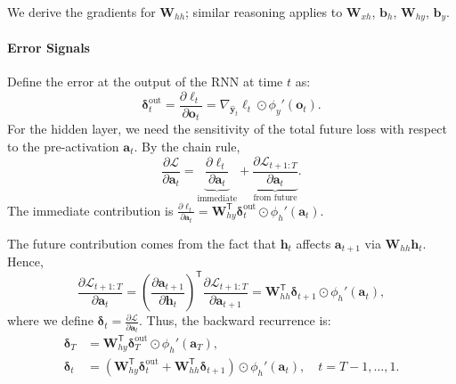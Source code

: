 \documentclass{tufte-handout}
\begin{document}
We derive the gradients for $\mathbf{W}_{hh}$; similar reasoning applies to $\mathbf{W}_{xh}$, $\mathbf{b}_h$, $\mathbf{W}_{hy}$, $\mathbf{b}_y$.

\paragraph{Error Signals}
Define the error at the output of the RNN at time $t$ as:
\[
\boldsymbol{\delta}_t^{\text{out}} = \frac{\partial \ell_t}{\partial \mathbf{o}_t} = \nabla_{\hat{\mathbf{y}}_t} \ell_t \odot \phi_y'(\mathbf{o}_t).
\]
For the hidden layer, we need the sensitivity of the total future loss with respect to the pre-activation $\mathbf{a}_t$. By the chain rule,
\[
\frac{\partial \mathcal{L}}{\partial \mathbf{a}_t} = \underbrace{\frac{\partial \ell_t}{\partial \mathbf{a}_t}}_{\text{immediate}} + \underbrace{\frac{\partial \mathcal{L}_{t+1:T}}{\partial \mathbf{a}_t}}_{\text{from future}}.
\]
The immediate contribution is $\frac{\partial \ell_t}{\partial \mathbf{a}_t} = \mathbf{W}_{hy}^{\mathsf{T}} \boldsymbol{\delta}_t^{\text{out}} \odot \phi_h'(\mathbf{a}_t)$.

The future contribution comes from the fact that $\mathbf{h}_t$ affects $\mathbf{a}_{t+1}$ via $\mathbf{W}_{hh}\mathbf{h}_t$. Hence,
\[
\frac{\partial \mathcal{L}_{t+1:T}}{\partial \mathbf{a}_t}
= \left( \frac{\partial \mathbf{a}_{t+1}}{\partial \mathbf{h}_t} \right)^{\mathsf{T}} \frac{\partial \mathcal{L}_{t+1:T}}{\partial \mathbf{a}_{t+1}}
= \mathbf{W}_{hh}^{\mathsf{T}} \boldsymbol{\delta}_{t+1} \odot \phi_h'(\mathbf{a}_t),
\]
where we define $\boldsymbol{\delta}_t = \frac{\partial \mathcal{L}}{\partial \mathbf{a}_t}$. Thus, the backward recurrence is:
\begin{align}
    \boldsymbol{\delta}_T &= \mathbf{W}_{hy}^{\mathsf{T}} \boldsymbol{\delta}_T^{\text{out}} \odot \phi_h'(\mathbf{a}_T), \\
    \boldsymbol{\delta}_t &= \left( \mathbf{W}_{hy}^{\mathsf{T}} \boldsymbol{\delta}_t^{\text{out}} + \mathbf{W}_{hh}^{\mathsf{T}} \boldsymbol{\delta}_{t+1} \right) \odot \phi_h'(\mathbf{a}_t), \quad t = T-1, \dots, 1.
\end{align}
\end{document}
